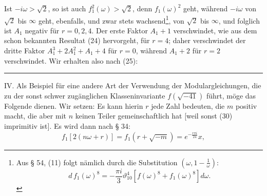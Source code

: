 Ist $-i\omega > \sqrt2$, so ist auch $f_1^2(\omega) > \sqrt2$, denn $f_1(\omega)^2$ geht,
während $-i\omega$ von $\sqrt2$ bis $\infty$ geht, ebenfalls, und zwar stets
wachsend\footnote{Aus § 54, (11) folgt nämlich durch die Substitution $(\omega, 1-\frac1{\omega})$:
\[ d\,f_1(\omega)^8 = -\frac{\pi i}{3}\vartheta_{10}^4\left[f(\omega)^8+f_1(\omega)^8\right]d\omega. \]},
von $\sqrt2$ bis $\infty$, und folglich ist $A_1$ negativ für
$r = 0, 2, 4$.
Der erste Faktor $A_1+1$ verschwindet, wie aus dem schon
bekannten Resultat (24) hervorgeht, für $r = 4$; daher verschwindet
der dritte Faktor $A_1^3+2A_1^2+A_1+4$ für $r = 0$, während
$A_1+2$ für $r = 2$ verschwindet.
Wir erhalten also nach (25):

\begin{center}\rule{3cm}{0.4pt}\end{center}

IV. Als Beispiel für eine andere Art der Verwendung der
 Modulargleichungen, die zu der sonst schwer zugänglichen
 Klasseninvariante $f(\sqrt{-41})$ führt, möge das Folgende
dienen.
Wir setzen:
Es kann hierin $r$ jede Zahl bedeuten, die $m$ positiv macht,
die aber mit $n$ keinen Teiler gemeinschaftlich hat [weil sonst
(30) imprimitiv ist]. Es wird dann nach § 34:
\[ f_1[2(n\omega+r)] = f_1(r+\sqrt{-m}) = e^{-\frac{r\pi i}{24}}x, \]
